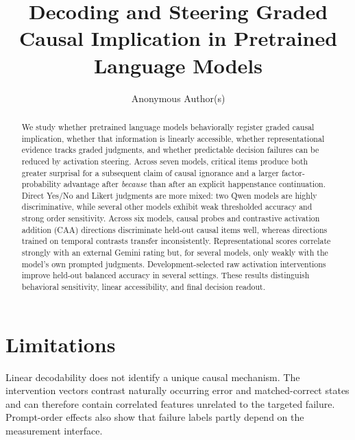 \documentclass{article}
\title{Decoding and Steering Graded Causal Implication in Pretrained Language Models}
\author{Anonymous Author(s)}
\newif\ifcompiledfromparent
\begin{document}
\maketitle

\begin{abstract}
We study whether pretrained language models behaviorally register graded causal implication, whether that information is linearly accessible, whether representational evidence tracks graded judgments, and whether predictable decision failures can be reduced by activation steering. Across seven models, critical items produce both greater surprisal for a subsequent claim of causal ignorance and a larger factor-probability advantage after \emph{because} than after an explicit happenstance continuation. Direct Yes/No and Likert judgments are more mixed: two Qwen models are highly discriminative, while several other models exhibit weak thresholded accuracy and strong order sensitivity. Across six models, causal probes and contrastive activation addition (CAA) directions discriminate held-out causal items well, whereas directions trained on temporal contrasts transfer inconsistently. Representational scores correlate strongly with an external Gemini rating but, for several models, only weakly with the model's own prompted judgments. Development-selected raw activation interventions improve held-out balanced accuracy in several settings. These results distinguish behavioral sensitivity, linear accessibility, and final decision readout.
\end{abstract}





\section*{Limitations}
Linear decodability does not identify a unique causal mechanism. The intervention vectors contrast naturally occurring error and matched-correct states and can therefore contain correlated features unrelated to the targeted failure. Prompt-order effects also show that failure labels partly depend on the measurement interface.


\ifcompiledfromparent
  
\else
  
\fi

\appendix


\newpage

\end{document}
